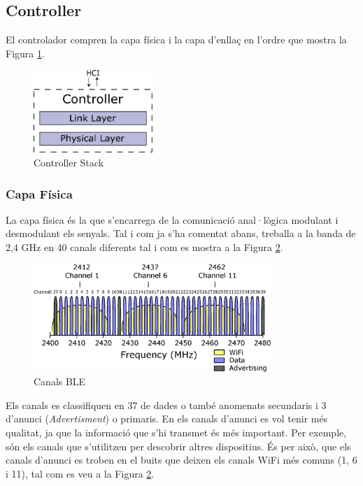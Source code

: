 \subsection{Controller}
El controlador compren la capa física i la capa d'enllaç en l'ordre que mostra la Figura \ref{controller_stack}.

\begin{figure}[h!]
	\begin{center}
		\includegraphics[width=0.4\textwidth]{./diagrames/BLE_Controller}
		\caption{Controller Stack}
		\label{controller_stack}
	\end{center}
\end{figure}

\subsubsection{Capa Física}
La capa física és la que s'encarrega de la comunicació anal·lògica modulant i desmodulant els senyals.
Tal i com ja s'ha comentat abans, treballa a la banda de 2,4 GHz en 40 canals diferents tal i com es mostra a la Figura \ref{BLE_Channels}.

\begin{figure}[hb]
	\begin{center}
		\includegraphics[width=0.8\textwidth]{./diagrames/BLE_WiFi}
		\caption{Canals BLE \cite{ble_feq}}
		\label{BLE_Channels}
	\end{center}
\end{figure}

Els canals es classifiquen en 37 de dades o també anomenats secundaris i 3 d'anunci (\textit{Advertisment}) o primaris.
En els canals d'anunci es vol tenir més qualitat, ja que la informació que s'hi transmet és més important.
Per exemple, són els canals que s'utilitzen per descobrir altres dispositius.
És per això, que els canals d'anunci es troben en el buits que deixen els canals WiFi més comuns (1, 6 i 11), tal com es veu a la Figura \ref{BLE_Channels}.

